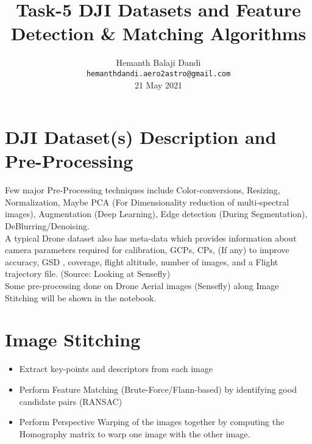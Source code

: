 \documentclass{article}[11pt]
\begin{document}
\title{ \bf Task-5 DJI Datasets and Feature Detection \& Matching Algorithms}
\author{Hemanth Balaji Dandi\\
{\tt hemanthdandi.aero2astro@gmail.com}
\\ {21 May 2021}
}


\date{} %

\maketitle

\onehalfspacing




\section{DJI Dataset(s) Description and Pre-Processing}

Few major Pre-Processing techniques include Color-conversions, Resizing, Normalization, Maybe PCA (For Dimensionality reduction of multi-spectral images), Augmentation (Deep Learning), Edge detection (During Segmentation), DeBlurring/Denoising.
\\A typical Drone dataset also has meta-data which provides information about camera parameters required for calibration, GCPs, CPs, (If any) to improve accuracy, GSD , coverage, flight altitude, number of images, and a Flight trajectory file. (Source: Looking at Sensefly)
\\Some pre-processing done on Drone Aerial images (Sensefly) along Image Stitching will be shown in the notebook.

\section{Image Stitching}
\begin{itemize}
    \item Extract key-points and descriptors from each image
    \item Perform Feature Matching (Brute-Force/Flann-based) by identifying good candidate pairs (RANSAC)
    \item Perform Perspective Warping of the images together by computing the Homography matrix to warp one image with the other image.
\end{itemize}
\end{document}
